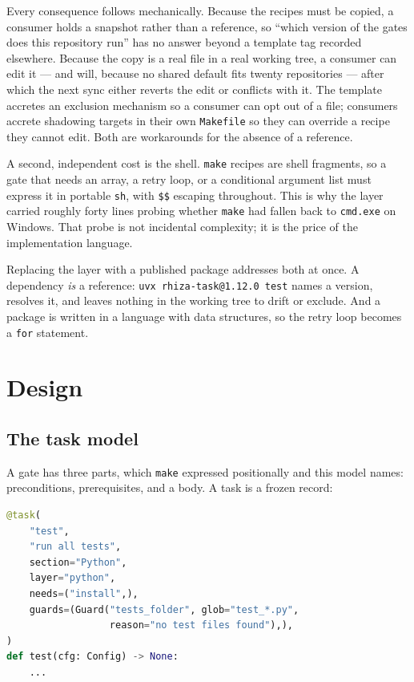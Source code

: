 \documentclass[11pt,a4paper]{article}
\begin{document}
Every consequence follows mechanically. Because the recipes must be copied, a consumer
holds a snapshot rather than a reference, so ``which version of the gates does this
repository run'' has no answer beyond a template tag recorded elsewhere. Because the copy
is a real file in a real working tree, a consumer can edit it --- and will, because no
shared default fits twenty repositories --- after which the next sync either reverts the
edit or conflicts with it. The template accretes an exclusion mechanism so a consumer can
opt out of a file; consumers accrete shadowing targets in their own \texttt{Makefile} so
they can override a recipe they cannot edit. Both are workarounds for the absence of a
reference.

A second, independent cost is the shell. \texttt{make} recipes are shell fragments, so a
gate that needs an array, a retry loop, or a conditional argument list must express it in
portable \texttt{sh}, with \texttt{\$\$} escaping throughout. This is why the layer carried
roughly forty lines probing whether \texttt{make} had fallen back to \texttt{cmd.exe} on
Windows. That probe is not incidental complexity; it is the price of the implementation
language.

Replacing the layer with a published package addresses both at once. A dependency
\emph{is} a reference: \texttt{uvx rhiza-task@1.12.0 test} names a version, resolves it, and
leaves nothing in the working tree to drift or exclude. And a package is written in a
language with data structures, so the retry loop becomes a \texttt{for} statement.

\section{Design}
\label{sec:design}

\subsection{The task model}

A gate has three parts, which \texttt{make} expressed positionally and this model names:
preconditions, prerequisites, and a body. A task is a frozen record:

\begin{lstlisting}[language=Python]
@task(
    "test",
    "run all tests",
    section="Python",
    layer="python",
    needs=("install",),
    guards=(Guard("tests_folder", glob="test_*.py",
                  reason="no test files found"),),
)
def test(cfg: Config) -> None:
    ...
\end{lstlisting}
\end{document}
